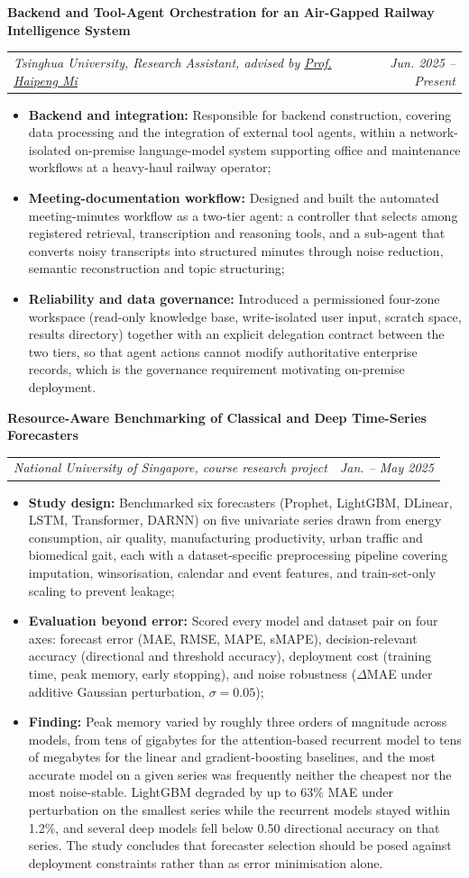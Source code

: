 \documentclass[a4paper,11pt]{article}
\makeatletter
\newcommand{\resumeItem}[2]{
  \item\small{\textbf{#1}{#2 \vspace{-2pt}}}
}
\newcommand{\resumeSubheadingalter}[3]{
  \vspace{2pt}\item
   \textbf{#1} \\
    \begin{tabular*}{0.97\textwidth}{@{}p{0.72\textwidth}@{\extracolsep{\fill}}r@{}}
      \textit{\small#2} & \textit{\small #3} \\
    \end{tabular*}\vspace{-5pt}
}
\newcommand{\resumeItemListStart}{\begin{itemize}[leftmargin=*,itemsep=1pt,topsep=2pt]}
\newcommand{\resumeItemListEnd}{\end{itemize}\vspace{-8pt}}
\makeatother
\begin{document}
\resumeSubheadingalter
{Backend and Tool-Agent Orchestration for an Air-Gapped Railway Intelligence System}
{Tsinghua University, Research Assistant, advised by \href{https://thfl.tsinghua.edu.cn/yjdw/jzg/zxjg/qt/yjy/mhp.htm}{Prof. Haipeng Mi}}{Jun. 2025 -- Present}
\resumeItemListStart
\resumeItem{Backend and integration: }
{Responsible for backend construction, covering data processing and the integration
of external tool agents, within a network-isolated on-premise language-model system
supporting office and maintenance workflows at a heavy-haul railway operator;}
\resumeItem{Meeting-documentation workflow: }
{Designed and built the automated meeting-minutes workflow as a two-tier agent:
a controller that selects among registered retrieval, transcription and reasoning
tools, and a sub-agent that converts noisy transcripts into structured minutes
through noise reduction, semantic reconstruction and topic structuring;}
\resumeItem{Reliability and data governance: }
{Introduced a permissioned four-zone workspace (read-only knowledge base,
write-isolated user input, scratch space, results directory) together with an
explicit delegation contract between the two tiers, so that agent actions cannot
modify authoritative enterprise records, which is the governance requirement
motivating on-premise deployment.}
\resumeItemListEnd

\resumeSubheadingalter
{Resource-Aware Benchmarking of Classical and Deep Time-Series Forecasters}
{National University of Singapore, course research project}{Jan. -- May 2025}
\resumeItemListStart
\resumeItem{Study design: }
{Benchmarked six forecasters (Prophet, LightGBM, DLinear, LSTM, Transformer, DARNN)
on five univariate series drawn from energy consumption, air quality, manufacturing
productivity, urban traffic and biomedical gait, each with a dataset-specific
preprocessing pipeline covering imputation, winsorisation, calendar and event
features, and train-set-only scaling to prevent leakage;}
\resumeItem{Evaluation beyond error: }
{Scored every model and dataset pair on four axes: forecast error (MAE, RMSE, MAPE,
sMAPE), decision-relevant accuracy (directional and threshold accuracy), deployment
cost (training time, peak memory, early stopping), and noise robustness ($\Delta$MAE
under additive Gaussian perturbation, $\sigma = 0.05$);}
\resumeItem{Finding: }
{Peak memory varied by roughly three orders of magnitude across models, from tens of
gigabytes for the attention-based recurrent model to tens of megabytes for the linear
and gradient-boosting baselines, and the most accurate model on a given series was
frequently neither the cheapest nor the most noise-stable. LightGBM degraded by up to
63\% MAE under perturbation on the smallest series while the recurrent models stayed
within 1.2\%, and several deep models fell below 0.50 directional accuracy on that
series. The study concludes that forecaster selection should be posed against
deployment constraints rather than as error minimisation alone.}
\resumeItemListEnd
\end{document}
